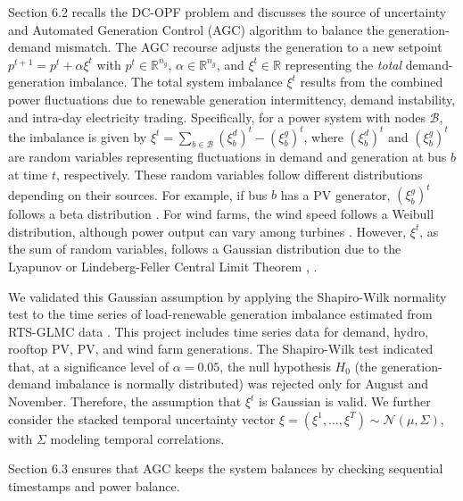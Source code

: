Section 6.2 recalls the DC-OPF problem and discusses the source of uncertainty and Automated Generation Control (AGC) algorithm to balance the generation-demand mismatch. The AGC recourse adjusts the generation to a new setpoint $p^{t+1} = p^t + \alpha \xi^t$ \cite{roald2017chance,baros2021examining,mezghani2020stochastic} with $p^t \in \mathbb{R}^{n_g}$, $\alpha \in \mathbb{R}^{n_g}$, and $\xi^t \in \mathbb{R}$ representing the \emph{total} demand-generation imbalance.
The total system imbalance $\xi^{t}$ results from the combined power fluctuations due to renewable generation intermittency, demand instability, and intra-day electricity trading. Specifically, for a power system with nodes $\mathcal{B}$, the imbalance is given by $\xi^t = \sum_{b \in \mathcal{B}} (\xi_b^d)^t - (\xi_b^g)^t$, where $(\xi_b^d)^t$ and $(\xi_b^g)^t$ are random variables representing fluctuations in demand and generation at bus $b$ at time $t$, respectively. These random variables follow different distributions depending on their sources. For example, if bus $b$ has a PV generator, $(\xi_b^g)^t$ follows a beta distribution \cite{wang2010probabilistic}. For wind farms, the wind speed follows a Weibull distribution, although power output can vary among turbines \cite{dhople2012framework}. However, $\xi^t$, as the sum of random variables, follows a Gaussian distribution due to the Lyapunov or Lindeberg-Feller Central Limit Theorem \cite{scholz2011central}, \cite{rouaud2013probability, draper2021practical}.

We validated this Gaussian assumption by applying the Shapiro-Wilk normality test \cite{shapiro1965analysis} to the time series of load-renewable generation imbalance estimated from RTS-GLMC data \cite{barrows2019ieee}. This project includes time series data for demand, hydro, rooftop PV, PV, and wind farm generations. The Shapiro-Wilk test indicated that, at a significance level of $\alpha=0.05$, the null hypothesis $H_0$ (the generation-demand imbalance is normally distributed) was rejected only for August and November. Therefore, the assumption that $\xi^t$ is Gaussian is valid.
We further consider the stacked temporal uncertainty vector $\xi = (\xi^1, \dots, \xi^T) \sim \mathcal{N}(\mu, \Sigma)$, with $\Sigma$ modeling temporal correlations.

Section 6.3 ensures that AGC keeps the system balances by checking sequential timestamps and power balance.

